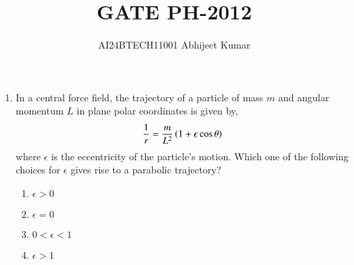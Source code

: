 \documentclass[journal]{IEEEtran}
\begin{document}

\vspace{3cm}


\renewcommand{\thefigure}{\theenumi}
\renewcommand{\thetable}{\theenumi}
\setlength{\intextsep}{10pt} %


\renewcommand{\thetable}{\theenumi}

\title{GATE PH-2012}
\author{AI24BTECH11001 Abhijeet Kumar
}
\maketitle
\renewcommand{\thefigure}{\theenumi}
\renewcommand{\thetable}{\theenumi}
\begin{enumerate}[start=14]
    \item In a central force field, the trajectory of a particle of mass $m$ and angular momentum $L$ in plane 
    polar coordinates is given by, 
    \begin{align*}
        \frac{1}{r}= \frac{m}{L^2} \left(1 + \epsilon\cos\theta\right)
    \end{align*}
    where $\epsilon$ is the eccentricity of the particle's motion. Which one of the following choices for $\epsilon$ gives rise to a parabolic trajectory?
    \begin{multicols}{4}
        \begin{enumerate}
            \item $\epsilon>0$
            \item $\epsilon=0$
            \item $0<\epsilon<1$
            \item $\epsilon>1$
        \end{enumerate}
    \end{multicols}


\end{enumerate}
\end{document}
